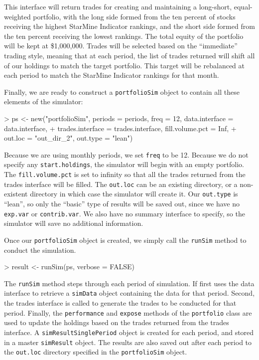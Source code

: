 \documentclass{article}
\begin{document}
This interface will return trades for creating and maintaining a
long-short, equal-weighted portfolio, with the long side formed from
the ten percent of stocks receiving the highest StarMine Indicator
rankings, and the short side formed from the ten percent receiving the
lowest rankings.  The total equity of the portfolio will be kept at
\$1,000,000.  Trades will be selected based on the ``immediate''
trading style, meaning that at each period, the list of trades
returned will shift all of our holdings to match the target portfolio.
This target will be rebalanced at each period to match the StarMine
Indicator rankings for that month.

Finally, we are ready to construct a \texttt{portfolioSim} object to
contain all these elements of the simulator:

\begin{Schunk}
\begin{Sinput}
> ps <- new("portfolioSim", periods = periods, freq = 12, data.interface = data.interface, 
+     trades.interface = trades.interface, fill.volume.pct = Inf, 
+     out.loc = "out_dir_2", out.type = "lean")
\end{Sinput}
\end{Schunk}

Because we are using monthly periods, we set \texttt{freq} to be 12.
Because we do not specify any \texttt{start.holdings}, the simulator
will begin with an empty portfolio.  The \texttt{fill.volume.pct} is
set to infinity so that all the trades returned from the trades
interface will be filled.  The \texttt{out.loc} can be an existing
directory, or a non-existent directory in which case the simulator
will create it.  Our \texttt{out.type} is ``lean'', so only the
``basic'' type of results will be saved out, since we have no
\texttt{exp.var} or \texttt{contrib.var}.  We also have no summary
interface to specify, so the simulator will save no additional
information.

Once our \texttt{portfolioSim} object is created, we simply call the
\texttt{runSim} method to conduct the simulation.

\begin{Schunk}
\begin{Sinput}
> result <- runSim(ps, verbose = FALSE)
\end{Sinput}
\end{Schunk}

The \texttt{runSim} method steps through each period of simulation.
If first uses the data interface to retrieve a \texttt{simData} object
containing the data for that period.  Second, the trades interface is
called to generate the trades to be conducted for that period.
Finally, the \texttt{performance} and \texttt{expose} methods of the
\texttt{portfolio} class are used to update the holdings based on the
trades returned from the trades interface.  A
\texttt{simResultSinglePeriod} object is created for each period, and
stored in a master \texttt{simResult} object.  The results are also
saved out after each period to the \texttt{out.loc} directory
specified in the \texttt{portfolioSim} object.
\end{document}
